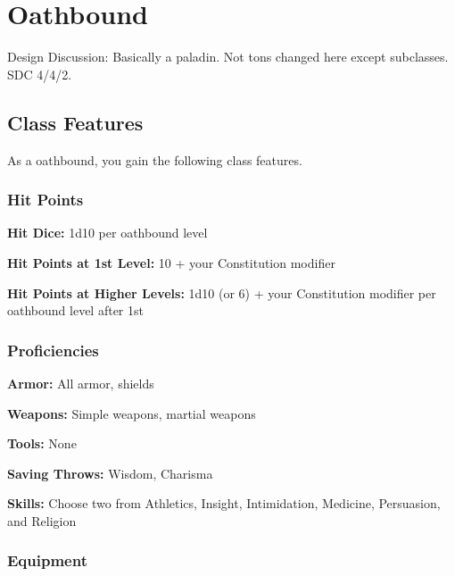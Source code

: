 \section{Oathbound}

Design Discussion: Basically a paladin. Not tons changed here except subclasses. SDC 4/4/2.

\subsection{Class Features}

As a oathbound, you gain the following class features.

\subsubsection{Hit Points}

\textbf{Hit Dice:} 1d10 per oathbound level

\textbf{Hit Points at 1st Level:} 10 + your Constitution modifier

\textbf{Hit Points at Higher Levels:} 1d10 (or 6) + your Constitution modifier per oathbound level after 1st

\subsubsection{Proficiencies}

\textbf{Armor:} All armor, shields

\textbf{Weapons:} Simple weapons, martial weapons

\textbf{Tools:} None

\textbf{Saving Throws:} Wisdom, Charisma

\textbf{Skills:} Choose two from Athletics, Insight, Intimidation, Medicine, Persuasion, and Religion

\subsubsection{Equipment}

